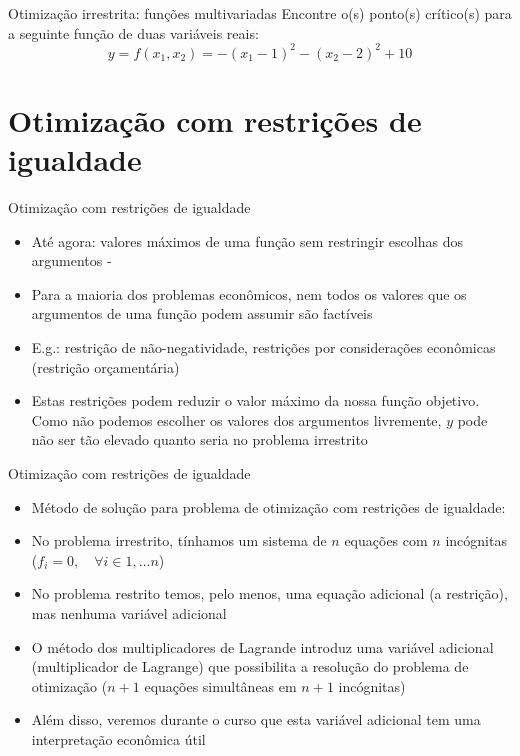 \documentclass[10pt]{beamer}
\begin{document}
\begin{frame}
    {Otimização irrestrita: funções multivariadas}
    Encontre o(s) ponto(s) crítico(s) para a seguinte função de duas variáveis reais:
    \[
      y = f(x_1, x_2) = -(x_1 - 1)^2 - (x_2 - 2)^2 + 10  
    \]
\end{frame}

\section{Otimização com restrições de igualdade}
\begin{frame}
    {Otimização com restrições de igualdade}
    \begin{itemize}
        \item[\emoji{warning}] Até agora: valores máximos de uma função sem restringir escolhas dos argumentos - \bigskip
        \item Para a maioria dos problemas econômicos, nem todos os valores que os argumentos de uma função podem assumir são factíveis\bigskip
        \item E.g.: restrição de não-negatividade, restrições por considerações econômicas (restrição orçamentária)\bigskip
        \item Estas restrições podem reduzir o valor máximo da nossa função objetivo. Como não podemos escolher os valores dos argumentos livremente, $y$ pode não ser tão elevado quanto seria no problema irrestrito
    \end{itemize}
\end{frame}

\begin{frame}
    {Otimização com restrições de igualdade}
    \begin{itemize}
        \item Método de solução para problema de otimização com restrições de igualdade: \bigskip
        \item No problema irrestrito, tínhamos um sistema de $n$ equações com $n$ incógnitas ($f_i = 0, \quad \forall i \in 1, \dots n$)\bigskip
        \item No problema restrito temos, pelo menos, uma equação adicional (a restrição), mas nenhuma variável adicional\bigskip
        \item O método dos multiplicadores de Lagrande introduz uma variável adicional (multiplicador de Lagrange) que possibilita a resolução do problema de otimização ($n + 1$ equações simultâneas em $n + 1$ incógnitas)\bigskip
        \item Além disso, veremos durante o curso que esta variável adicional tem uma interpretação econômica útil
    \end{itemize}
\end{frame}
\end{document}
